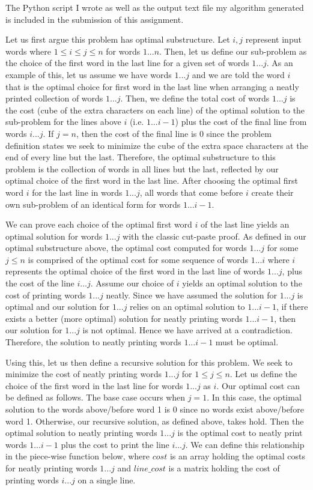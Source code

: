 \documentclass[11pt]{article}
\begin{document}
The Python script I wrote as well as the output text file my algorithm generated is included in the submission of this assignment.

Let us first argue this problem has optimal substructure. Let $i,j$ represent input words where $1 \leq i \leq j \leq n$ for words $1...n$. Then, let us define our sub-problem as the choice of the first word in the last line for a given set of words $1...j$. As an example of this, let us assume we have words $1...j$ and we are told the word $i$ that is the optimal choice for first word in the last line when arranging a neatly printed collection of words $1...j$. Then, we define the total cost of words $1...j$ is the cost (cube of the extra characters on each line) of the optimal solution to the sub-problem for the lines above $i$ (i.e. $1...i-1$) plus the cost of the final line from words $i...j$. If $j = n$, then the cost of the final line is 0 since the problem definition states we seek to minimize the cube of the extra space characters at the end of every line but the last. Therefore, the optimal substructure to this problem is the collection of words in all lines but the last, reflected by our optimal choice of the first word in the last line. After choosing the optimal first word $i$ for the last line in words $1...j$, all words that come before $i$ create their own sub-problem of an identical form for words $1...i-1$.

We can prove each choice of the optimal first word $i$ of the last line yields an optimal solution for words $1...j$ with the classic cut-paste proof. As defined in our optimal substructure above, the optimal cost computed for words $1...j$ for some $j \leq n$ is comprised of the optimal cost for some sequence of words $1...i$ where $i$ represents the optimal choice of the first word in the last line of words $1...j$, plus the cost of the line $i...j$. Assume our choice of $i$ yields an optimal solution to the cost of printing words $1...j$ neatly. Since we have assumed the solution for $1...j$ is optimal and our solution for $1...j$ relies on an optimal solution to $1...i-1$, if there exists a better (more optimal) solution for neatly printing words $1...i-1$, then our solution for $1...j$ is not optimal. Hence we have arrived at a contradiction. Therefore, the solution to neatly printing words $1...i-1$ must be optimal.

Using this, let us then define a recursive solution for this problem. We seek to minimize the cost of neatly printing words $1...j$ for $1 \leq j \leq n$. Let us define the choice of the first word in the last line for words $1...j$ as $i$. Our optimal cost can be defined as follows. The base case occurs when $j=1$. In this case, the optimal solution to the words above/before word 1 is 0 since no words exist above/before word 1. Otherwise, our recursive solution, as defined above, takes hold. Then the optimal solution to neatly printing words $1...j$ is the optimal cost to neatly print words $1...i-1$ plus the cost to print the line $i...j$. We can define this relationship in the piece-wise function below, where $cost$ is an array holding the optimal costs for neatly printing words $1...j$ and $line\_cost$ is a matrix holding the cost of printing words $i...j$ on a single line.
\end{document}
